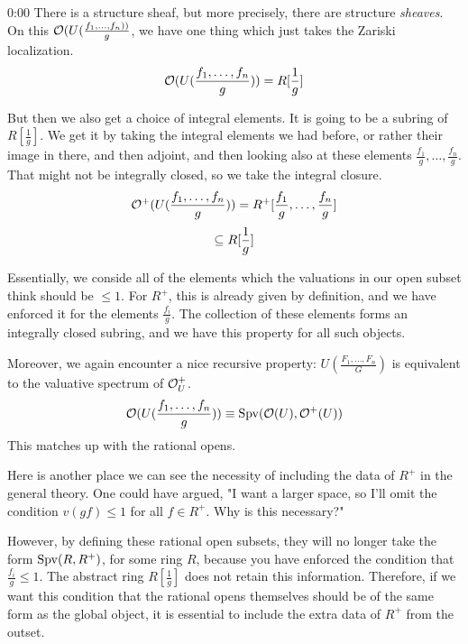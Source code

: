\begin{unfinished}{0:00}
There is a structure sheaf, but more precisely, there are structure \emph{sheaves}. On this $\mathcal O(U(\frac{f_1, \ldots, f_n))}{g}$, we have one thing which just takes the Zariski localization. 
\begin{align*}
\mathcal O(U(\frac{f_1, \ldots, f_n}{g})) = R[\frac{1}{g}]
\end{align*}

But then we also get a choice of integral elements. It is going to be a subring of $R[\frac{1}{g}]$. We get it by taking the integral elements we had before, or rather their image in there, and then adjoint, and then looking also at these elements $\frac{f_1}{g}, \ldots, \frac{f_n}{g}$. That might not be integrally closed, so we take the integral closure. 
\begin{align*}
\mathcal O^+(U(\frac{f_1, \ldots, f_n}{g})) = R^+[\frac{f_1}{g}, \ldots , \frac{f_n}{g} ]
\end{align*}
\begin{align*}
\subseteq R[\frac{1}{g}]
\end{align*}

Essentially, we conside all of the elements which the valuations in our open subset think should be $\leq 1$. For $R^+$, this is already given by definition, and we have enforced it for the elements $\frac{f_i}{g}$. The collection of these elements forms an integrally closed subring, and we have this property for all such objects.

Moreover, we again encounter a nice recursive property: $U(\frac{F_1, \ldots, F_n}{G})$ is equivalent to the valuative spectrum of $\mathcal O_U^+$.
\begin{align*}
\mathcal O(U(\frac{f_1, \ldots, f_n}{g})) \equiv \operatorname{Spv}(\mathcal O(U), \mathcal O^+(U))
\end{align*}
This matches up with the rational opens.

Here is another place we can see the necessity of including the data of $R^+$ in the general theory. One could have argued, "I want a larger space, so I'll omit the condition $v(gf) \leq 1$ for all $f \in R^+$. Why is this necessary?"

However, by defining these rational open subsets, they will no longer take the form $\operatorname{Spv}(R,R^+)$, for some ring $R$, because you have enforced the condition that $\frac{f_i}{g} \leq 1$. 
The abstract ring $R[\frac{1}{g}]$  does not  retain this information. Therefore, if we want this condition that the rational opens themselves should be of the same form as the global object, it is essential to include the extra data of $R^+$ from the outset.


\end{unfinished}

